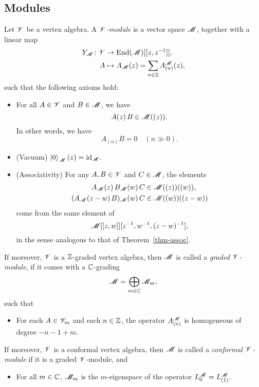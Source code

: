 \subsection{Modules}

\begin{definition}
    Let $\mathscr{V}$ be a vertex algebra.
    A \emph{$\mathscr{V}$-module} is a vector space $\mathscr{M}$,
    together with a linear map
    \begin{align*}
        Y_{\mathscr{M}} \colon \mathscr{V} & \to \operatorname{End} (\mathscr{M}) [[z, z^{-1}]], \\
        A & \mapsto A_{\mathscr{M}} (z) = \sum_{n \in \mathbb{Z}} A_{(n)}^{\mathscr{M}} (z),
    \end{align*}
    such that the following axioms hold:
    \begin{itemize}
        \item
            For all $A \in \mathscr{V}$ and $B \in \mathscr{M}$, we have
            \[
                A (z) \, B \in \mathscr{M} ((z)).
            \]
            In other words, we have
            \[
                A_{(n)} B = 0 \quad (n \gg 0).
            \]
        \item
            \textup{(Vacuum)}
            $\mathinner{\mathopen{|}0\mathclose{\rangle}}_{\mathscr{M}} (z) = \operatorname{id}_{\mathscr{M}}$.
        \item
            \textup{(Associativity)}
            For any $A, B \in \mathscr{V}$ and $C \in \mathscr{M}$,
            the elements
            \begin{align*}
                A_{\mathscr{M}} (z) \, B_{\mathscr{M}} (w) \, C
                & \in \mathscr{M} ((z)) ((w)), \\
                (A_{\mathscr{M}} (z - w) \, B)_{\mathscr{M}} (w) \, C
                & \in \mathscr{M} ((w)) ((z - w))
            \end{align*}
            come from the same element of
            \[
                \mathscr{M} [[z, w]] [z^{-1}, w^{-1}, (z-w)^{-1}],
            \]
            in the sense analogous to that of Theorem~\ref{thm-assoc}.
    \end{itemize}
    If moreover, $\mathscr{V}$ is a $\mathbb{Z}$-graded vertex algebra,
    then $\mathscr{M}$ is called a \emph{graded $\mathscr{V}$-module},
    if it comes with a $\mathbb{C}$-grading
    \[
        \mathscr{M} = \bigoplus_{m \in \mathbb{C}} \mathscr{M}_m,
    \]
    such that
    \begin{itemize}
        \item
            For each $A \in \mathscr{V}_m$ and each $n \in \mathbb{Z}$,
            the operator $A_{(n)}^{\mathscr{M}}$ is homogeneous
            of degree $-n - 1 + m$.
    \end{itemize}
    If moreover, $\mathscr{V}$ is a conformal vertex algebra,
    then $\mathscr{M}$ is called a \emph{conformal $\mathscr{V}$-module}
    if it is a graded $\mathscr{V}$-module, and
    \begin{itemize}
        \item
            For all $m \in \mathbb{C}$,
            $\mathscr{M}_m$ is the $m$-eigenspace of the operator
            $L^{\mathscr{M}}_0 = L^{\mathscr{M}}_{(1)}$.
            \varqed
    \end{itemize}
\end{definition}

